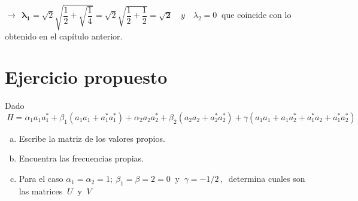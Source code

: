 $\to \ \ \boldsymbol{ \lambda_1}=\sqrt{2} \sqrt{\dfrac 1 2 + \sqrt{\dfrac 1 4 }}=\sqrt{2}\sqrt{\dfrac 1 2 + \dfrac 1 2 }= \boldsymbol {\sqrt{2}} \quad y \quad \lambda_2=0\ $ que coincide con lo obtenido en el capítulo anterior.

\vspace{1cm}
\section{Ejercicio propuesto}

\begin{ejercicio}

\begin{adjustwidth}{20pt}{20pt}

\vspace{2mm}	
Dado $\ H=\alpha_1 a_1a_1^*+\beta_1(a_1a_1+a_1^*a_1^*)+
\alpha_2 a_2a_2^*+\beta_2(a_2a_2+a_2^*a_2^*)+
\gamma(a_1a_1+a_1a_2^*+a_1^*a_2+a_1^*a_2^*)$

\begin{enumerate}[a) ]
\item Escribe la matriz de los valores propios.
\item Encuentra las frecuencias propias.
\item Para el caso $\alpha_1=\alpha_2=1;\ \beta_1=\beta=2=0	 \ \text{ y } \ \gamma=-1/2\, , \ $ determina cuales son las matrices $\ U \ \text{ y } \ V$
\end{enumerate}
\vspace{2mm}

\end{adjustwidth}
 \end{ejercicio}
 
 
 \newpage
 
 
 
